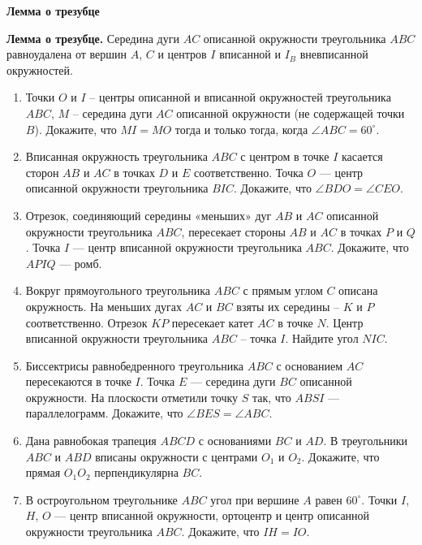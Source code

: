 \documentclass{article}
\begin{document}
\large
	
	
	\begin{center}
		\textbf{Лемма о трезубце}
	\end{center}

{\bf Лемма о трезубце.} Середина дуги $AC$ описанной окружности треугольника $ABC$ равноудалена от вершин $A$, $C$ и центров $I$ вписанной и $I_B$ вневписанной окружностей.

\begin{enumerate}[label*=\protect\fbox{\arabic{enumi}}]
	
\item Точки $O$ и $I$ -- центры описанной и вписанной окружностей треугольника $ABC$, $M$ -- середина дуги $AC$ описанной окружности (не содержащей точки $B$). Докажите, что $MI = MO$ тогда и только тогда, когда $\angle ABC = 60^{\circ}$.

\item  Вписанная окружность треугольника $ABC$ с центром в точке $I$ касается сторон $AB$ и $AC$ в точках $D$ и $E$ соответственно. Точка $O$ --- центр описанной окружности треугольника $BIC$. Докажите, что $\angle BDO = \angle CEO$.

\item Отрезок, соединяющий середины «меньших» дуг $AB$ и $AC$ описанной окружности треугольника $ABC$, пересекает стороны $AB$ и $AC$ в точках $P$ и $Q$. Точка $I$ --- центр вписанной окружности треугольника $ABC$. Докажите, что $APIQ$ --- ромб.

\item Вокруг прямоугольного треугольника $ABC$ с прямым углом $C$ описана окружность. На меньших дугах $AC$ и $BC$ взяты их середины -- $K$ и $P$ соответственно. Отрезок $KP$ пересекает катет $AC$ в точке $N$. Центр вписанной окружности треугольника $ABC$ -- точка $I$. Найдите угол $NIC$. 

\item Биссектрисы равнобедренного треугольника $ABC$ с основанием $AC$ пересекаются в точке $I$. Точка $E$ --- середина дуги $BC$ описанной окружности. На плоскости отметили точку $S$ так, что $ABSI$ --- параллелограмм. Докажите, что $\angle BES = \angle ABC$.  

\item Дана равнобокая трапеция $ABCD$ с основаниями $BC$ и $AD$. В треугольники $ABC$ и $ABD$ вписаны окружности с центрами $O_1$ и $O_2$. Докажите, что прямая $O_1O_2$ перпендикулярна $BC$.

\item В остроугольном треугольнике $ABC$ угол при вершине $A$ равен $60^{\circ}$. Точки $I$, $H$, $O$ --- центр вписанной окружности, ортоцентр и центр описанной окружности треугольника $ABC$. Докажите, что $IH = IO$.


\end{enumerate}
\end{document}
